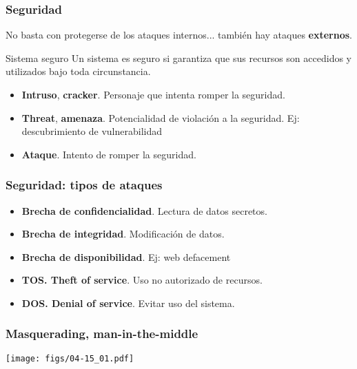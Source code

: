 \documentclass[letter]{beamer}
\begin{document}
\begin{frame}
  \frametitle{Seguridad}
  No basta con protegerse de los ataques internos... también hay ataques {\bf externos}.
  
  \begin{block}{Sistema seguro}
    Un sistema es seguro si garantiza que sus recursos son accedidos y utilizados
    bajo toda circunstancia.
  \end{block}

  \begin{itemize}
    \item {\bf Intruso}, {\bf cracker}. Personaje que intenta romper la seguridad.
    \item {\bf Threat}, {\bf amenaza}. Potencialidad de violación a la seguridad. Ej: descubrimiento de vulnerabilidad
    \item {\bf Ataque}. Intento de romper la seguridad.
  \end{itemize}

\end{frame}
\begin{frame}
  \frametitle{Seguridad: tipos de ataques}
  \begin{itemize}
    \item {\bf Brecha de confidencialidad}. Lectura de datos secretos.
    \item {\bf Brecha de integridad}. Modificación de datos.
    \item {\bf Brecha de disponibilidad}. Ej: web defacement
    \item {\bf TOS. Theft of service}. Uso no autorizado de recursos.
    \item {\bf DOS. Denial of service}. Evitar uso del sistema.
  \end{itemize}

\end{frame}
\begin{frame}
  \frametitle{{\bf Masquerading}, {\bf man-in-the-middle}}

  \begin{center}
    \texttt{[image: figs/04-15\_01.pdf]}
  \end{center}

\end{frame}
\end{document}
